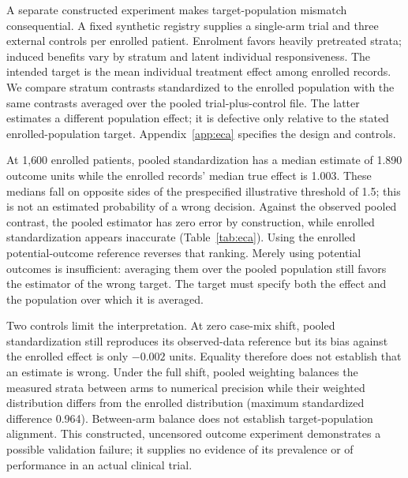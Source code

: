 A separate constructed experiment makes target-population mismatch consequential.
A fixed synthetic registry supplies a single-arm trial and three external
controls per enrolled patient. Enrolment favors heavily pretreated strata;
induced benefits vary by stratum and latent individual responsiveness.
The intended target is the mean individual treatment effect among enrolled
records. We compare stratum contrasts standardized to the enrolled population
with the same contrasts averaged over the pooled trial-plus-control file.
The latter estimates a different population effect; it is defective only
relative to the stated enrolled-population target. Appendix~\ref{app:eca}
specifies the design and controls.


At 1{,}600 enrolled patients, pooled standardization has a median estimate of
1.890 outcome units while the enrolled records' median true effect is 1.003.
These medians fall on opposite sides of the prespecified illustrative threshold
of 1.5; this is not an estimated probability of a wrong decision.
Against the observed pooled contrast, the pooled estimator has zero error by
construction, while enrolled standardization appears inaccurate
(Table~\ref{tab:eca}). Using the enrolled potential-outcome reference reverses
that ranking. Merely using potential outcomes is insufficient: averaging them
over the pooled population still favors the estimator of the wrong target.
The target must specify both the effect and the population over which it is
averaged.

Two controls limit the interpretation. At zero case-mix shift, pooled
standardization still reproduces its observed-data reference but its bias
against the enrolled effect is only $-0.002$ units. Equality therefore does
not establish that an estimate is wrong. Under the full shift, pooled
weighting balances the measured strata between arms to numerical precision
while their weighted distribution differs from the enrolled distribution
(maximum standardized difference 0.964). Between-arm balance does not establish
target-population alignment. This constructed, uncensored outcome experiment
demonstrates a possible validation failure; it supplies no evidence of its
prevalence or of performance in an actual clinical trial.
